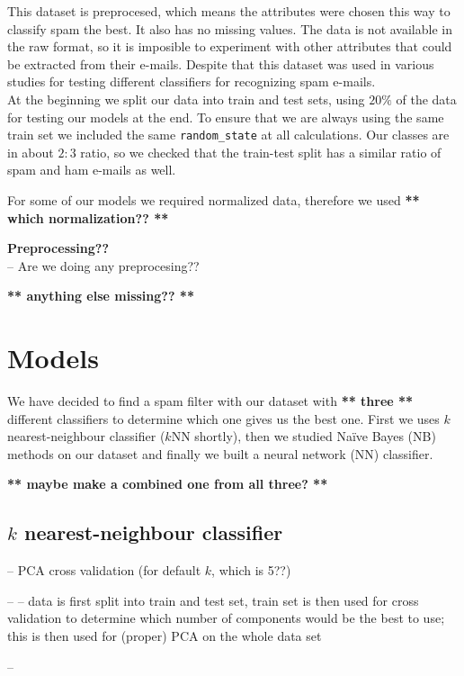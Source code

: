 \documentclass[11pt,a4paper]{article}
\begin{document}
This dataset is preprocesed, which means the attributes were chosen this way to classify spam the best. It also has no missing values. The data is not available in the raw format, so it is imposible to experiment with other attributes that could be extracted from their e-mails. Despite that this dataset was used in various studies for testing different classifiers for recognizing spam e-mails.\\

At the beginning we split our data into train and test sets, using $20\%$ of the data for testing our models at the end. To ensure that we are always using the same train set we included the same {\tt random\_state} at all calculations. 
Our classes are in about $2:3$ ratio, so we checked that the train-test split has a similar ratio of spam and ham e-mails as well.

For some of our models we required normalized data, therefore we used \textbf{** which normalization?? **}


\bigskip
\textbf{Preprocessing??}\\
-- Are we doing any preprocesing??

\bigskip
\textbf{** anything else missing?? **}


\section{Models}
\label{sec-models}

We have decided to find a spam filter with our dataset with \textbf{** three **} different classifiers to determine which one gives us the best one. First we uses $k$ nearest-neighbour classifier ($k$NN shortly), then we studied Na\"ive Bayes (NB) methods on our dataset and finally we built a neural network (NN) classifier.

\textbf{** maybe make a combined one from all three? **}

\subsection{$k$ nearest-neighbour classifier}

-- PCA cross validation (for default $k$, which is 5??)

-- -- data is first split into train and test set, train set is then used for cross validation to determine which number of components would be the best to use; this is then used for (proper) PCA on the whole data set 

-- 
\end{document}
